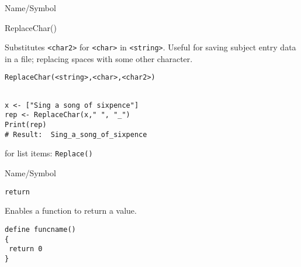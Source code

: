 \rl


\begin{desc}{Name/Symbol}
\item[Name/Symbol]  	ReplaceChar()

\item[Description]  	Substitutes  \verb+<char2>+ for \verb+<char>+
  in \verb+<string>+. Useful for saving subject entry data in a file;
  replacing spaces with some other character.

\item[Usage]        	
\begin{verbatim}
ReplaceChar(<string>,<char>,<char2>)
\end{verbatim}
			  
\item[Example]     	
\begin{verbatim}

x <- ["Sing a song of sixpence"]
rep <- ReplaceChar(x," ", "_")
Print(rep)
# Result:  Sing_a_song_of_sixpence
\end{verbatim}

\item[See Also]	
 for list items: \verb+Replace()+ 
\end{desc}

\rl


\begin{desc}{Name/Symbol}
\item[Name/Symbol] 	\verb+return+

\item[Description]  	Enables a function to return a value.

\item[Usage]
\begin{verbatim}
define funcname()
{
 return 0
}
\end{verbatim}

\item[Example]	

\item[See Also]	
\end{desc}

\rl


